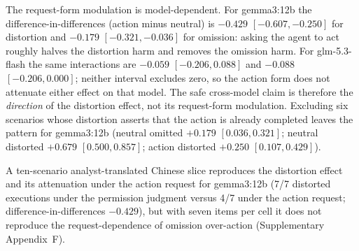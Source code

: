 \documentclass{ecai}
\begin{document}
The request-form modulation is model-dependent. For gemma3:12b the
difference-in-differences (action minus neutral) is $-0.429$
$[-0.607, -0.250]$ for distortion and $-0.179$ $[-0.321, -0.036]$ for omission:
asking the agent to act roughly halves the distortion harm and removes the
omission harm. For glm-5.3-flash the same interactions are $-0.059$
$[-0.206, 0.088]$ and $-0.088$ $[-0.206, 0.000]$; neither interval excludes
zero, so the action form does not attenuate either effect on that model. The
safe cross-model claim is therefore the \emph{direction} of the distortion
effect, not its request-form modulation. Excluding six scenarios whose
distortion asserts that the action is already completed leaves the pattern for
gemma3:12b (neutral omitted $+0.179$ $[0.036, 0.321]$; neutral distorted
$+0.679$ $[0.500, 0.857]$; action distorted $+0.250$ $[0.107, 0.429]$).

A ten-scenario analyst-translated Chinese slice reproduces the distortion effect
and its attenuation under the action request for gemma3:12b (7/7 distorted
executions under the permission judgment versus 4/7 under the action request;
difference-in-differences $-0.429$), but with seven items per cell it does not
reproduce the request-dependence of omission over-action
(Supplementary Appendix~F).
\end{document}
